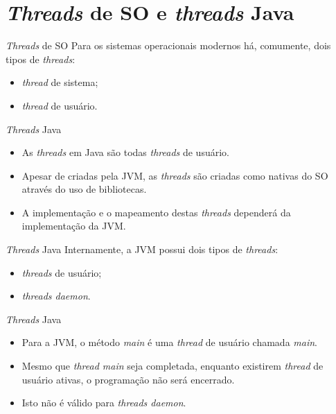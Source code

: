 \documentclass[11pt,justified]{beamer}
\begin{document}
\section{\textit{Threads} de SO e \textit{threads} Java}

\begin{frame}{\textit{Threads} de SO}
    Para os sistemas operacionais modernos há, comumente, dois tipos de \textit{threads}:
    \begin{itemize}
        \item \textit{thread} de sistema;
        \item \textit{thread} de usuário.
    \end{itemize}
\end{frame}

\begin{frame}{\textit{Threads} Java}
    \begin{itemize}
        \item As \textit{threads} em Java são todas \textit{threads} de usuário.
        \item Apesar de criadas pela JVM, as \textit{threads} são criadas como nativas do SO através do uso de bibliotecas.
        \item A implementação e o mapeamento destas \textit{threads} dependerá da implementação da JVM.
    \end{itemize}
\end{frame}


\begin{frame}{\textit{Threads} Java}
    Internamente, a JVM possui dois tipos de \textit{threads}:
    \begin{itemize}
        \item \textit{threads} de usuário;
        \item \textit{threads daemon}.
    \end{itemize}
\end{frame}

\begin{frame}{\textit{Threads} Java}
    \begin{itemize}
        \item Para a JVM, o método \textit{main} é uma \textit{thread} de usuário chamada \textit{main}.
        \item Mesmo que \textit{thread main} seja completada, enquanto existirem \textit{thread} de usuário ativas, o programação não será encerrado.
        \item Isto não é válido para \textit{threads daemon}.
    \end{itemize}
\end{frame}
\end{document}
